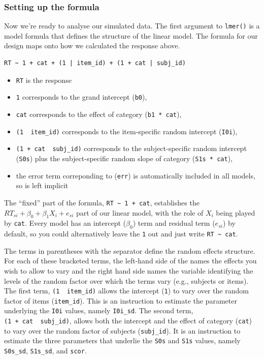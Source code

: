 \documentclass[man,floatsintext]{apa6}
\providecommand{\tightlist}{%
  \setlength{\itemsep}{0pt}\setlength{\parskip}{0pt}}
\begin{document}
\hypertarget{setting-up-the-formula}{%
\subsubsection{Setting up the formula}\label{setting-up-the-formula}}

Now we're ready to analyse our simulated data. The first argument to \texttt{lmer()} is a model formula that defines the structure of the linear model. The formula for our design maps onto how we calculated the response above.

\begin{verbatim}
RT ~ 1 + cat + (1 | item_id) + (1 + cat | subj_id)
\end{verbatim}

\begin{itemize}
\tightlist
\item
  \texttt{RT} is the response
\item
  \texttt{1} corresponds to the grand intercept (\texttt{b0}),
\item
  \texttt{cat} corresponds to the effect of category (\texttt{b1\ *\ cat}),
\item
  \texttt{(1\ \textbar{}\ item\_id)} corresponds to the item-specific random intercept (\texttt{I0i}),
\item
  \texttt{(1\ +\ cat\ \textbar{}\ subj\_id)} corresponds to the subject-specific random intercept (\texttt{S0s}) plus the subject-specific random slope of category (\texttt{S1s\ *\ cat}),
\item
  the error term correponding to (\texttt{err}) is automatically included in all models, so is left implicit
\end{itemize}

The \enquote{fixed} part of the formula, \texttt{RT\ \textasciitilde{}\ 1\ +\ cat}, establishes the \(RT_{si} + \beta_0 + \beta_1 X_i + e_{si}\) part of our linear model, with the role of \(X_i\) being played by \texttt{cat}. Every model has an intercept (\(\beta_0\)) term and residual term (\(e_{si}\)) by default, so you could alternatively leave the \texttt{1} out and just write \texttt{RT\ \textasciitilde{}\ cat}.

The terms in parentheses with the \texttt{\textbar{}} separator define the random effects structure. For each of these bracketed terms, the left-hand side of the \texttt{\textbar{}} names the effects you wish to allow to vary and the right hand side names the variable identifying the levels of the random factor over which the terms vary (e.g., subjects or items). The first term, \texttt{(1\ \textbar{}\ item\_id)} allows the intercept (\texttt{1}) to vary over the random factor of items (\texttt{item\_id}). This is an instruction to estimate the parameter underlying the \texttt{I0i} values, namely \texttt{I0i\_sd}. The second term, \texttt{(1\ +\ cat\ \textbar{}\ subj\_id)}, allows both the intercept and the effect of category (\texttt{cat}) to vary over the random factor of subjects (\texttt{subj\_id}). It is an instruction to estimate the three parameters that underlie the \texttt{S0s} and \texttt{S1s} values, namely \texttt{S0s\_sd}, \texttt{S1s\_sd}, and \texttt{scor}.
\end{document}
